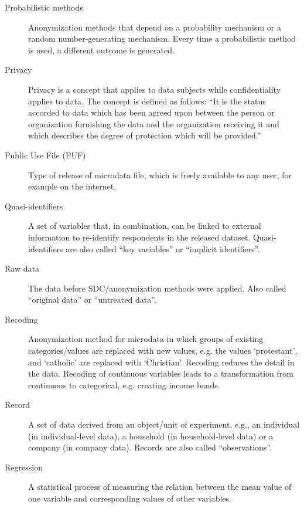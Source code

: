 \documentclass[letterpaper,10pt,english]{sphinxmanual}
\begin{document}
\begin{description}
\item[{Probabilistic methods}] \leavevmode
Anonymization methods that depend on a probability mechanism or a
random number-generating  mechanism. Every time a   probabilistic method is used, a
different outcome is generated.

\item[{Privacy}] \leavevmode
Privacy is a concept that applies to data subjects while confidentiality applies to data.
The concept is defined as   follows: “It is the status accorded to data which has been
agreed upon between the person or organization furnishing the data  and the organization
receiving it and which describes the degree of protection which will be  provided.” \sphinxfootnotemark[2]

\item[{Public Use File (PUF)}] \leavevmode
Type of release of microdata   file, which is freely available   to any user, for example on the   internet.

\item[{Quasi-identifiers}] \leavevmode
A set of variables that, in combination, can be linked to  external information to
re-identify respondents in the released dataset.  Quasi-identifiers are also called
“key variables” or “implicit   identifiers”.

\item[{Raw data}] \leavevmode
The data before SDC/anonymization methods were applied. Also called “original data”
or “untreated  data”.

\item[{Recoding}] \leavevmode
Anonymization method for  microdata in which groups of   existing categories/values
are replaced with new values, e.g. the values ‘protestant’, and   ‘catholic’ are replaced with
‘Christian’. Recoding reduces the detail in the data. Recoding of   continuous variables leads to a
transformation from continuous to categorical, e.g. creating income bands.

\item[{Record}] \leavevmode
A set of data derived from an  object/unit of experiment, e.g.,  an individual
(in  individual-level data), a household (in household-level  data) or a company (in company data). Records are also called “observations”.

\item[{Regression}] \leavevmode
A statistical process of  measuring the relation between the mean value of one variable and corresponding values of other variables.


\end{description}
\end{document}
